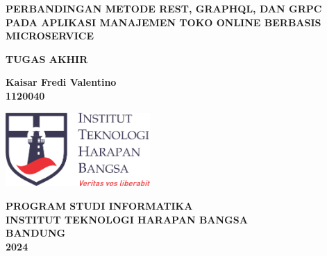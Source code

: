 \begin{titlepage}
	\begin{center}
		\vspace*{0cm}
		
    		{\large \bfseries PERBANDINGAN METODE REST, GRAPHQL, DAN
GRPC PADA APLIKASI MANAJEMEN TOKO ONLINE
BERBASIS MICROSERVICE
\\}
			
		\vspace{3cm}
		
	 	{\large \bfseries TUGAS AKHIR}

		\vspace{2.5cm}
		
		{ \bfseries Kaisar Fredi Valentino \\ 1120040 }
		
	
		\vspace*{\fill} 
		
		\includegraphics[width=5.5cm]{img/ithb.png}	
		\vspace{2.5cm}\
        

		{\large \bfseries PROGRAM STUDI INFORMATIKA \\
		INSTITUT TEKNOLOGI HARAPAN BANGSA \\
		BANDUNG\\
		2024}
		
		\vspace{1cm}
	\end{center}
\end{titlepage}
